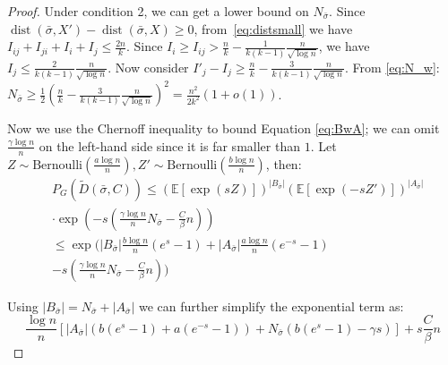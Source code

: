\documentclass[entropy,article,accept,moreauthors,pdftex]{Definitions/mdpi}
\newcommand{\A}{\frac{a \log n}{n}}
\newcommand{\B}{\frac{b \log n}{n}}
\newcommand{\1}{\mathbbm{1}}
\DeclareMathOperator{\Dist}{dist}
\begin{document}
\begin{paracol}{2}
\begin{proof}
	
	Under condition 2, we can get a lower bound on $N_{\bar{\sigma}}$. Since
	$\Dist(\bar{\sigma}, X') - \Dist(\bar{\sigma}, X) \geq 0$, from~\eqref{eq:distsmall} we have
	$I_{ij} + I_{ji} + I_{i} + I_j \leq \frac{2n}{k} $.
	Since $I_i \geq I_{ij} > \frac{n}{k} - \frac{1}{k(k-1)}\frac{n}{\sqrt{\log n}}$,
	we have\linebreak $I_j \leq \frac{2}{k(k-1)}\frac{n}{\sqrt{\log n} }$.
	Now consider $I'_j - I_j \geq  \frac{n}{k} - \frac{3}{k(k-1)}\frac{n}{\sqrt{\log n} }$.
	From \eqref{eq:N_w}:\linebreak $N_{\bar{\sigma}} \geq \frac{1}{2}(\frac{n}{k} - \frac{3}{k(k-1)}\frac{n}{\sqrt{\log n}})^2 = \frac{n^2}{2k^2}(1+o(1))$.
	
	Now we use the Chernoff inequality to bound Equation \eqref{eq:BwA}; we can omit $\frac{\gamma \log n}{n}$ on the left-hand side since it is far smaller than $1$.
	Let $Z \sim \textrm{Bernoulli}(\A), Z' \sim \textrm{Bernoulli}(\B)$, then:
	\begin{align*}
	&P_G(\widetilde{D}(\bar{\sigma}, C))
	\leq (\mathbb{E}[\exp(sZ)])^{|B_{\bar{\sigma}}|}(\mathbb{E}[\exp(-sZ')])^{|A_{\bar{\sigma}}|}\\
	&\cdot \exp(-s(\frac{\gamma \log n}{n} N_{\bar{\sigma}}  - \frac{C}{\beta}n)) \\
	& \leq \exp\Big(|B_{\bar{\sigma}}|\frac{b\log n}{n}(e^s -1) + |A_{\bar{\sigma}}|\frac{a\log n}{n} (e^{-s} - 1) \\
	&-s(\frac{\gamma \log n}{n} N_{\bar{\sigma}}  - \frac{C}{\beta}n)\Big) 
	\end{align*}
	
	Using $|B_{\bar{\sigma}}| = N_{\bar{\sigma}} + |A_{\bar{\sigma}}|$ we can further simplify the exponential term as:
	$$
	\frac{\log n}{n} [|A_{\bar{\sigma}}|(b(e^s -1)+ a(e^{-s} - 1)) +
	N_{\bar{\sigma}} (b(e^s - 1)-\gamma s)]  + s \frac{C}{\beta}n
	$$
	

\end{proof}
\end{paracol}
\end{document}
